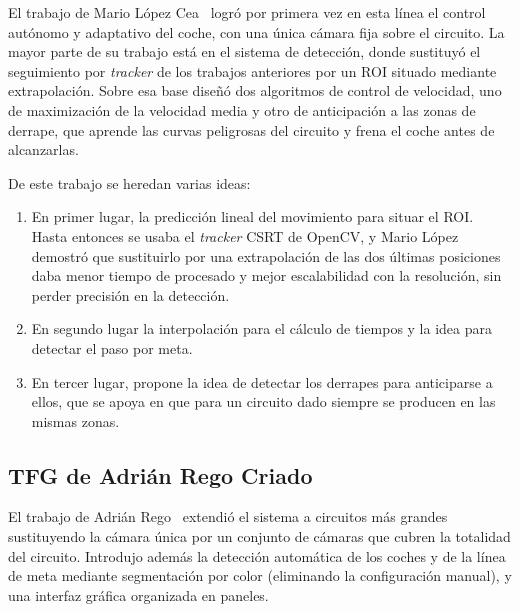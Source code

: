 El trabajo de Mario López Cea~\cite{tfgmario} logró por primera vez en esta línea el control autónomo y adaptativo del coche, con una única cámara fija sobre el circuito. La mayor parte de su trabajo está en el sistema de detección, donde sustituyó el seguimiento por \textit{tracker} de los trabajos anteriores por un ROI situado mediante extrapolación. Sobre esa base diseñó dos algoritmos de control de velocidad, uno de maximización de la velocidad media y otro de anticipación a las zonas de derrape, que aprende las curvas peligrosas del circuito y frena el coche antes de alcanzarlas.

De este trabajo se heredan varias ideas:
\begin{enumerate}
    \item En primer lugar, la predicción lineal del movimiento para situar el ROI. Hasta entonces se usaba el \textit{tracker} CSRT de OpenCV, y Mario López demostró que sustituirlo por una extrapolación de las dos últimas posiciones daba menor tiempo de procesado y mejor escalabilidad con la resolución, sin perder precisión en la detección.
    \item En segundo lugar la interpolación para el cálculo de tiempos y la idea para detectar el paso por meta.
    \item En tercer lugar, propone la idea de detectar los derrapes para anticiparse a ellos, que se apoya en que para un circuito dado siempre se producen en las mismas zonas.
\end{enumerate}

\subsection{TFG de Adrián Rego Criado}
\label{sec:tfg-adrian}

El trabajo de Adrián Rego~\cite{tfgadrian} extendió el sistema a circuitos más grandes sustituyendo la cámara única por un conjunto de cámaras que cubren la totalidad del circuito. Introdujo además la detección automática de los coches y de la línea de meta mediante segmentación por color (eliminando la configuración manual), y una interfaz gráfica organizada en paneles.

